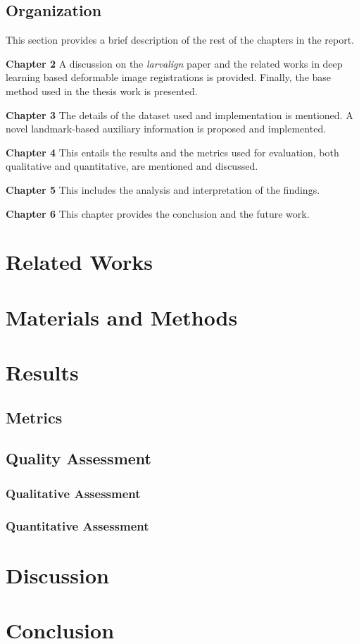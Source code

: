 \documentclass{article}
\begin{document}
	\subsection{Organization}
	This section provides a brief description of the rest of the chapters in the report.
	
	\textbf{Chapter 2} A discussion on the \emph{larvalign} paper and the related works in deep learning based deformable image registrations is provided. Finally, the base method used in the thesis work is presented. 
	
	\textbf{Chapter 3} The details of the dataset used and implementation is mentioned. A novel landmark-based auxiliary information is proposed and implemented.
	
	\textbf{Chapter 4} This entails the results and the metrics used for evaluation, both qualitative and quantitative, are mentioned and discussed.
	
	\textbf{Chapter 5} This includes the analysis and interpretation of the findings.
	
	\textbf{Chapter 6} This chapter provides the conclusion and the future work.
	
	\section{Related Works}
	
	\section{Materials and Methods}
	
	\section{Results}
	\subsection{Metrics}
	\subsection{Quality Assessment}
	\subsubsection{Qualitative Assessment}
	\subsubsection{Quantitative Assessment}
	
	\section{Discussion}
	
	\section{Conclusion}
	
	\newpage
	
	
\end{document}
